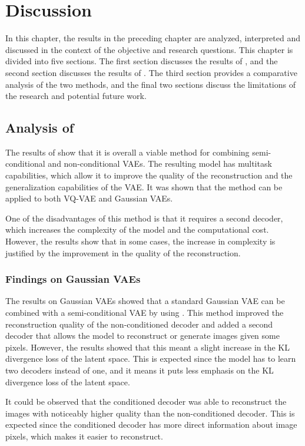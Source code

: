 \chapter{Discussion}

In this chapter, the results in the preceding chapter are analyzed, interpreted and discussed in the context of the objective and research questions. This chapter is divided into five sections. The first section discusses the results of , and the second section discusses the results of . The third section provides a comparative analysis of the two methods, and the final two sections discuss the limitations of the research and potential future work.

\section{Analysis of }

The results of  show that it is overall a viable method for combining semi-conditional and non-conditional VAEs. The resulting model has multitask capabilities, which allow it to improve the quality of the reconstruction and the generalization capabilities of the VAE. It was shown that the method can be applied to both VQ-VAE  and Gaussian VAEs.

One of the disadvantages of this method is that it requires a second decoder, which increases the complexity of the model and the computational cost. However, the results show that in some cases, the increase in complexity is justified by the improvement in the quality of the reconstruction.

\subsection{Findings on Gaussian VAEs}

The results on Gaussian VAEs showed that a standard Gaussian VAE can be combined with a semi-conditional VAE by using . This method improved the reconstruction quality of the non-conditioned decoder and added a second decoder that allows the model to reconstruct or generate images given some pixels. However, the results showed that this meant a slight increase in the KL divergence loss of the latent space. This is expected since the model has to learn two decoders instead of one, and it means it puts less emphasis on the KL divergence loss of the latent space.

It could be observed that the conditioned decoder was able to reconstruct the images with noticeably higher quality than the non-conditioned decoder. This is expected since the conditioned decoder has more direct information about image pixels, which makes it easier to reconstruct.  

